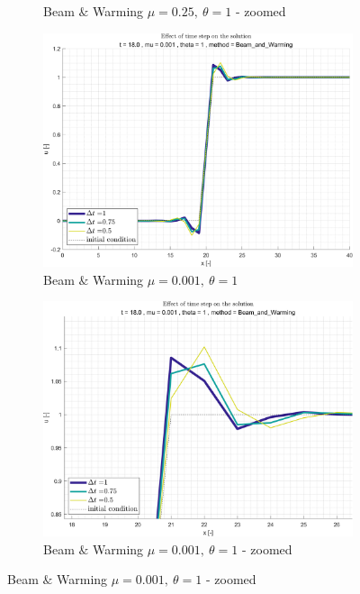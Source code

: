 \documentclass[11pt, a4paper]{article}
\begin{document}
\begin{figure}[H]
\begin{subfigure}[c]{.38\textwidth}
        \caption{Beam $\&$ Warming $\mu=0.25,\ \theta=1$ - zoomed}
        \label{fig:Beam & Warming_general_mu0.25_theta1_B_diff_time}
    \end{subfigure}
    \begin{subfigure}[c]{.38\textwidth}
        \centering
        \includegraphics[width=\textwidth]{images/grap13.png}
        \caption{Beam $\&$ Warming $\mu=0.001,\ \theta=1$}
        \label{fig:Beam & Warming_general_mu0.001_theta1_A_diff_time}
    \end{subfigure}
    \begin{subfigure}[c]{.38\textwidth}
        \centering
        \includegraphics[width=\textwidth]{images/grap13.1.png}
        \caption{Beam $\&$ Warming $\mu=0.001,\ \theta=1$ - zoomed}

\end{subfigure}
\end{figure}
\end{document}
